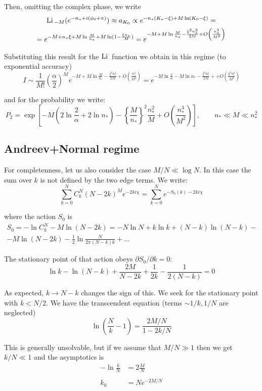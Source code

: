 Then, omitting the complex phase, we write
\begin{multline*}
\mathrm{Li}\,_{-M}(e^{-n_{*}+i(\phi_{0}+\pi)})\approx a_{K_{0}}\propto e^{-n_{*}(K_{*}-\xi)+M\ln(K_{0}-\xi)}=\\
=e^{-M+n_{*}\xi+M\ln\frac{M}{n_{*}}+M\ln(1-\frac{\xi n_{*}}{M})}=e^{-M+M\ln\frac{M}{n_{*}}-\frac{\xi^{2}n_{*}^{2}}{2M}+O\left(\frac{n_{*}^{3}}{M^{2}}\right)}\\
\end{multline*}

Substituting this result for the $\mathrm{Li}\,$ function we obtain in this
regime (to exponential accuracy)
\[
I\sim\frac{1}{M!}(\frac{\alpha}{2})^{M}e^{-M+M\ln\frac{M}{n_{*}}-\frac{\xi^{2}n_{*}^{2}}{2M}+O\left(\frac{n_{*}^{3}}{M^{2}}\right)}=e^{-M\ln\frac{2}{\alpha}-M\ln n_{*}-\frac{\xi^{2}n_{*}^{2}}{2M}++O\left(\frac{\xi^{3}n_{*}^{3}}{M^{2}}\right)}
\]

and for the probability we write:
\[
P_{2}=\exp\left[-M\left(2\ln\frac{2}{\alpha}+2\ln n_{*}\right)-\left\{ \frac{M}{n_{*}}\right\} ^{2}\frac{n_{*}^{2}}{M}+O\left(\frac{n_{*}^{3}}{M^{2}}\right)\right],\qquad n_{*}\ll M\ll n_{*}^{2}
\]

\subsection{Andreev+Normal regime}

For completenness, let us also consider the case $M/N\ll\log N$.
In this case the sum over $k$ is not defined by the two edge terms.
We write:
\[
\sum_{k=0}^{N}C_{k}^{N}(N-2k)^{M}e^{-2ki\chi}=\sum_{k=0}^{N}e^{-S_{0}(k)-2ki\chi}
\]

where the action $S_{0}$ is 
\begin{multline*}
S_{0}=-\ln C_{k}^{N}-M\ln(N-2k)=-N\ln N+k\ln k+(N-k)\ln(N-k)-\\
-M\ln(N-2k)-\frac{1}{2}\ln\frac{N}{2\pi(N-k)k}+\dots
\end{multline*}

The stationary point of that action obeys $\partial S_{0}/\partial k=0$:
\[
\ln k-\ln(N-k)+\frac{2M}{N-2k}+\frac{1}{2k}-\frac{1}{2(N-k)}=0
\]

As expected, $k\to N-k$ changes the sign of this. We seek for the
stationary point with $k<N/2$. We have the transcendent equation
(terms $\sim1/k,1/N$ are neglected)
\[
\ln(\frac{N}{k}-1)=\frac{2M/N}{1-2k/N}
\]

This is generally unsolvable, but if we assume that $M/N\gg1$ then
we get $k/N\ll1$ and the asymptotics is
\begin{align*}
-\ln\frac{k}{N} & =2\frac{M}{N}\\
\\
k_{0} & =Ne^{-2M/N}
\end{align*}

